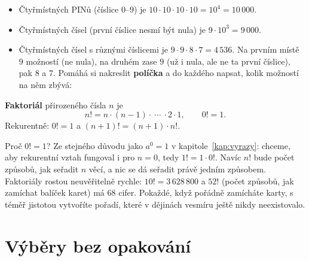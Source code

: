 \begin{example}
  \begin{itemize}
    \item Čtyřmístných PINů (číslice $0$--$9$) je $10\cdot 10\cdot 10\cdot 10 = 10^4 = 10\,000$.
    \item Čtyřmístných čísel (první číslice nesmí být nula) je $9\cdot 10^3 = 9\,000$.
    \item Čtyřmístných čísel s různými číslicemi je $9\cdot 9\cdot 8\cdot 7 = 4\,536$. Na prvním místě $9$ možností (ne nula), na druhém zase $9$ (už i nula, ale ne ta první číslice), pak $8$ a $7$. Pomáhá si nakreslit \textbf{políčka} a do každého napsat, kolik možností na něm zbývá:
    \begin{center}
    \end{center}
  \end{itemize}
\end{example}

\begin{definitionbox}
  \textbf{Faktoriál} přirozeného čísla $n$ je
  \begin{equation*}
    n! = n\cdot(n - 1)\cdot\ \cdots\ \cdot 2\cdot 1,\qquad 0! = 1.
  \end{equation*}
  Rekurentně: $0! = 1$ a $(n + 1)! = (n + 1)\cdot n!$.
\end{definitionbox}

Proč $0! = 1$? Ze stejného důvodu jako $a^0 = 1$ v kapitole~\ref{kap:vyrazy}: chceme, aby rekurentní vztah fungoval i pro $n = 0$, tedy $1! = 1\cdot 0!$. Navíc $n!$ bude počet způsobů, jak seřadit $n$ věcí, a nic se dá seřadit právě jedním způsobem. Faktoriály rostou neuvěřitelně rychle: $10! = 3\,628\,800$ a $52!$ (počet způsobů, jak zamíchat balíček karet) má $68$ cifer. Pokaždé, když pořádně zamícháte karty, s téměř jistotou vytvoříte pořadí, které v dějinách vesmíru ještě nikdy neexistovalo.

\section{Výběry bez opakování}\label{sec:vybery-bez-opakovani}

